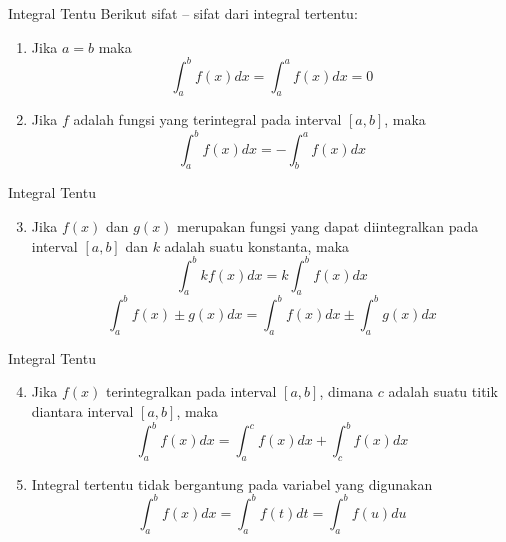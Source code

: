 \documentclass[pdflatex,compress,mathserif]{beamer}
\begin{document}
		\begin{frame}{Integral Tentu}
			Berikut sifat – sifat dari integral tertentu:
			\begin{enumerate}
				\item Jika $ a = b $ maka
				\begin{equation}
					\int_{a}^{b} f(x) dx = \int_{a}^{a} f(x) dx = 0
				\end{equation}
				\item  Jika $ f $ adalah fungsi yang terintegral pada interval $ [a, b] $, maka 
				\begin{equation}
					\int_{a}^{b} f(x) dx = -\int_{b}^{a} f(x) dx
				\end{equation}
			\end{enumerate}
		\end{frame}
	
		\begin{frame}{Integral Tentu}
			\begin{enumerate}\setcounter{enumi}{2}
				\item Jika $ f(x) $ dan $ g(x) $ merupakan fungsi yang dapat diintegralkan pada interval $ [a, b] $ dan $ k $ adalah suatu konstanta, maka
				\begin{equation}
					\int_{a}^{b} k f(x) dx = k\int_{a}^{b} f(x) dx
				\end{equation}
				\begin{equation}
					\int_{a}^{b} f(x) \pm g(x) dx = \int_{a}^{b} f(x) dx \pm \int_{a}^{b} g(x) dx
				\end{equation}
			\end{enumerate}
		\end{frame}
	
		\begin{frame}{Integral Tentu}
			\begin{enumerate}\setcounter{enumi}{3}
				\item Jika $ f(x) $ terintegralkan pada interval $ [a, b] $, dimana $ c $ adalah suatu titik diantara interval $ [a, b] $, maka
				\begin{equation}
					\int_{a}^{b} f(x) dx = \int_{a}^{c} f(x) dx + \int_{c}^{b} f(x) dx
				\end{equation}
				\item Integral tertentu tidak bergantung pada variabel yang digunakan
				\begin{equation}
					\int_{a}^{b} f(x) dx = \int_{a}^{b} f(t) dt = \int_{a}^{b} f(u) du
				\end{equation}
			\end{enumerate}
		\end{frame}
	
\end{document}
